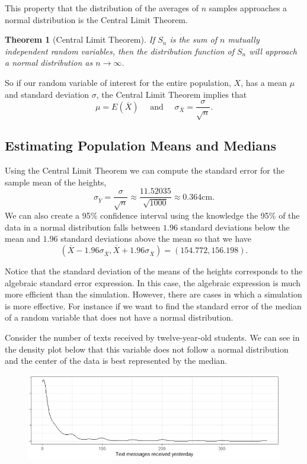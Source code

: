 \documentclass[
]{book}
\newtheorem{theorem}{Theorem}[chapter]
\theoremstyle{definition}
\theoremstyle{definition}
\theoremstyle{definition}
\theoremstyle{definition}
\theoremstyle{remark}
\begin{document}
This property that the distribution of the averages of \(n\) samples approaches a normal distribution is the Central Limit Theorem.

\begin{theorem}[Central Limit Theorem]
If \(S_n\) is the sum of \(n\) mutually independent random variables, then the distribution function of \(S_n\) will approach a normal distribution as \(n\rightarrow \infty\).
\end{theorem}

So if our random variable of interest for the entire population, \(X\), has a mean \(\mu\) and standard deviation \(\sigma\), the Central Limit Theorem implies that
\[\mu = E(\overline{X}) \quad \mbox{ and } \quad \sigma_{\overline{X}}= \frac{\sigma}{\sqrt{n}}.\]

\hypertarget{estimating-population-means-and-medians}{%
\subsection{Estimating Population Means and Medians}\label{estimating-population-means-and-medians}}

Using the Central Limit Theorem we can compute the standard error for the sample mean of the heights,
\[ \sigma_{\overline{Y}} = \frac{\sigma}{\sqrt{n}} \approx \frac{11.52035}{\sqrt{1000}} \approx 0.364 \mbox{cm}.\]
We can also create a 95\% confidence interval using the knowledge the 95\% of the data in a normal distribution falls between \(1.96\) standard deviations below the mean and \(1.96\) standard deviations above the mean so that we have
\[( \overline{X} - 1.96 \sigma_{\overline{X}}, \overline{X} + 1.96 \sigma_{\overline{X}}) = (154.772, 156.198) .\]

Notice that the standard deviation of the means of the heights corresponds to the algebraic standard error expression. In this case, the algebraic expression is much more efficient than the simulation. However, there are cases in which a simulation is more effective. For instance if we want to find the standard error of the median of a random variable that does not have a normal distribution.

Consider the number of texts received by twelve-year-old students. We can see in the density plot below that this variable does not follow a normal distribution and the center of the data is best represented by the median.

\begin{figure}

{\centering \includegraphics[width=0.6\linewidth]{images/texts_received_dist} 

}

\end{figure}
\end{document}
